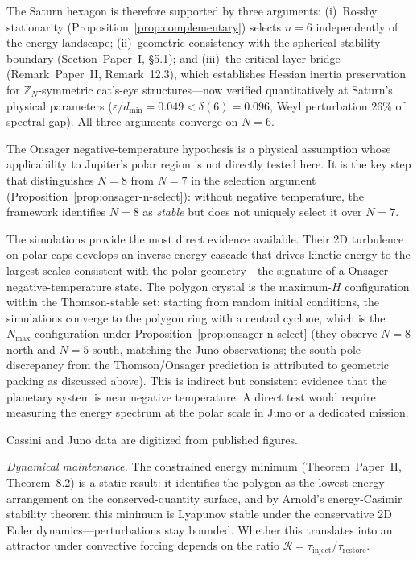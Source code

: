 The Saturn hexagon is therefore supported by three arguments:
(i)~Rossby stationarity (Proposition~\ref{prop:complementary}) selects
$n = 6$ independently of the energy landscape;
(ii)~geometric consistency with the spherical stability boundary
(Section~Paper~I, \S5.1); and
(iii)~the critical-layer bridge (Remark~Paper~II, Remark~12.3), which
establishes Hessian inertia preservation for $\mathbb{Z}_N$-symmetric
cat's-eye structures---now verified quantitatively at Saturn's
physical parameters ($\varepsilon/d_{\min} = 0.049 < \delta(6) = 0.096$,
Weyl perturbation $26\%$ of spectral gap).  All three arguments
converge on $N = 6$.

The Onsager negative-temperature hypothesis is a physical assumption
whose applicability to Jupiter's polar region is not directly tested
here.  It is the key step that distinguishes $N = 8$ from $N = 7$
in the selection argument (Proposition~\ref{prop:onsager-n-select}):
without negative temperature, the framework identifies $N = 8$ as
\emph{stable} but does not uniquely select it over $N = 7$.

The \citet{Siegelman2022} simulations provide the most direct evidence
available.  Their 2D turbulence on polar caps develops an inverse energy
cascade that drives kinetic energy to the largest scales consistent with
the polar geometry---the signature of a Onsager negative-temperature
state.  The polygon crystal is the maximum-$H$ configuration within
the Thomson-stable set: starting from random initial conditions, the
simulations converge to the polygon ring with a central cyclone, which
is the $N_{\max}$ configuration under Proposition~\ref{prop:onsager-n-select}
(they observe $N = 8$ north and $N = 5$ south, matching the Juno
observations; the south-pole discrepancy from the Thomson/Onsager
prediction is attributed to geometric packing as discussed above).
This is indirect but consistent evidence that the planetary system is
near negative temperature.  A direct test would require measuring the
energy spectrum at the polar scale in Juno or a dedicated mission.

Cassini and Juno data are digitized from published figures.

\emph{Dynamical maintenance.}%
\label{sec:dynamical-maintenance}
The constrained energy minimum (Theorem~Paper~II, Theorem~8.2) is
a static result: it identifies the polygon as the lowest-energy
arrangement on the conserved-quantity surface, and by Arnold's energy-Casimir
stability theorem \citep{Arnold1966} this minimum is Lyapunov stable
under the conservative 2D Euler dynamics---perturbations stay bounded.
Whether this translates into an attractor under convective forcing
depends on the ratio $\mathcal{R} = \tau_{\mathrm{inject}}/\tau_{\mathrm{restore}}$.

